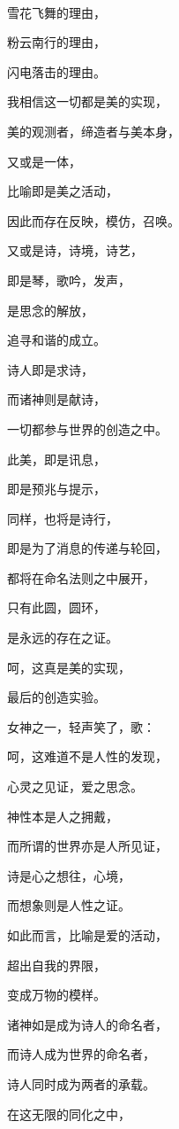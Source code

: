 \documentclass[UTF8]{article}
\begin{document}
\\[0.6cm]
\par 雪花飞舞的理由，
\par 粉云南行的理由，
\par 闪电落击的理由。
\par 我相信这一切都是美的实现，
\par 美的观测者，缔造者与美本身，
\par 又或是一体，
\par 比喻即是美之活动，
\par 因此而存在反映，模仿，召唤。
\par 又或是诗，诗境，诗艺，
\par 即是琴，歌吟，发声，
\par 是思念的解放，
\par 追寻和谐的成立。
\par 诗人即是求诗，
\par 而诸神则是献诗，
\par 一切都参与世界的创造之中。
\par 此美，即是讯息，
\par 即是预兆与提示，
\par 同样，也将是诗行，
\par 即是为了消息的传递与轮回，
\par 都将在命名法则之中展开，
\par 只有此圆，圆环，
\par 是永远的存在之证。
\par 呵，这真是美的实现，
\par 最后的创造实验。
\\[0.6cm]
\par 女神之一，轻声笑了，歌：
\\[0.6cm]
\par 呵，这难道不是人性的发现，
\par 心灵之见证，爱之思念。
\par 神性本是人之拥戴，
\par 而所谓的世界亦是人所见证，
\par 诗是心之想往，心境，
\par 而想象则是人性之证。
\par 如此而言，比喻是爱的活动，
\par 超出自我的界限，
\par 变成万物的模样。
\par 诸神如是成为诗人的命名者，
\par 而诗人成为世界的命名者，
\par 诗人同时成为两者的承载。
\par 在这无限的同化之中，
\end{document}
